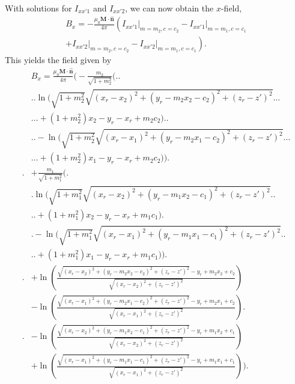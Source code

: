 With solutions for \(I_{xx'1}\) and \(I_{xx'2}\), we can now obtain the \(x\)-field,
\begin{align}
    B_x = -\frac{\mu_0\mathbf{M}\cdot\hat{\mathbf{n}}}{4\pi} \left( \left. I_{xx'1} \right|_{m=m_2,c=c_2} - \left. I_{xx'1} \right|_{m=m_1,c=c_1} \right. \nonumber \\
    \left. + \left. I_{xx'2} \right|_{m=m_2,c=c_2} - \left. I_{xx'2} \right|_{m=m_1,c=c_1} \right) \text{.}
\end{align}
\newpage
This yields the field given by
\begin{align}
    &B_x = \frac{\mu_0\mathbf{M}\cdot\hat{\mathbf{n}}}{4\pi}\Bigg( -\frac{m_2}{\sqrt{1+m_2^2}}\Big( \Big. \Bigg. \nonumber \\
    & \Bigg.\Big. \ln \big( \sqrt{1+m_2^2}\sqrt{\left(x_r-x_2\right)^2 + \left(y_r-m_2x_2-c_2\right)^2+\left(z_r-z'\right)^2} \nonumber \big. \Big. \Bigg. \\
    & \Bigg. \Big. \big. + \left(1+m_2^2\right)x_2-y_r-x_r+m_2c_2 \big) \Big. \Bigg. \nonumber \\
    & \Bigg. \Big. - \ln \big( \sqrt{1+m_2^2}\sqrt{\left(x_r-x_1\right)^2 + \left(y_r-m_2x_1-c_2\right)^2+\left(z_r-z'\right)^2} \nonumber \big. \Big. \Bigg. \\
    & \Bigg. \Big. \big. + \left(1+m_2^2\right)x_1-y_r-x_r+m_2c_2 \big) \Big) \Bigg. \nonumber \\
    \Bigg. &+ \frac{m_1}{\sqrt{1+m_1^2}}\Big( \Big. \nonumber \\
    & \Big. \ln \big( \sqrt{1+m_1^2}\sqrt{\left(x_r-x_2\right)^2 + \left(y_r-m_1x_2-c_1\right)^2+\left(z_r-z'\right)^2} \nonumber \big. \Big. \\
    & \Big. \big. + \left(1+m_1^2\right)x_2-y_r-x_r+m_1c_1 \big) \Big. \nonumber \\
    & \Big. - \ln \big( \sqrt{1+m_1^2}\sqrt{\left(x_r-x_1\right)^2 + \left(y_r-m_1x_1-c_1\right)^2+\left(z_r-z'\right)^2} \nonumber \big. \Big. \\
    & \Big. \big. + \left(1+m_1^2\right)x_1-y_r-x_r+m_1c_1 \big) \Big) \Bigg. \nonumber \\
    \Bigg. &+ \ln\left(\frac{\sqrt{\left(x_r-x_2\right)^2+\left(y_r-m_2x_2-c_2\right)^2+\left(z_r-z'\right)^2}-y_r+m_2x_2+c_2}{\sqrt{\left(x_r-x_2\right)^2+\left(z_r-z'\right)^2}}\right) \nonumber \\
    & - \ln\left(\frac{\sqrt{\left(x_r-x_1\right)^2+\left(y_r-m_2x_1-c_2\right)^2+\left(z_r-z'\right)^2}-y_r+m_2x_1+c_2}{\sqrt{\left(x_r-x_1\right)^2+\left(z_r-z'\right)^2}}\right) \Bigg. \nonumber \\
    \Bigg. & - \ln\left(\frac{\sqrt{\left(x_r-x_2\right)^2+\left(y_r-m_1x_2-c_1\right)^2+\left(z_r-z'\right)^2}-y_r+m_1x_2+c_1}{\sqrt{\left(x_r-x_2\right)^2+\left(z_r-z'\right)^2}}\right) \nonumber \\
    & + \ln\left(\frac{\sqrt{\left(x_r-x_1\right)^2+\left(y_r-m_1x_1-c_1\right)^2+\left(z_r-z'\right)^2}-y_r+m_1x_1+c_1}{\sqrt{\left(x_r-x_1\right)^2+\left(z_r-z'\right)^2}}\right) \Bigg) \text{.}
\end{align}

